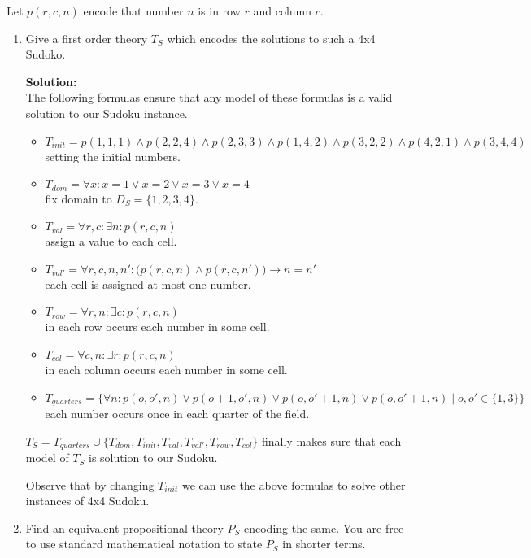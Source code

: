 \documentclass[11pt,a4paper]{uebung}
\newcommand{\solution}[1]{\par {\bf Solution:}\\#1}
\begin{document}
Let $p(r,c,n)$ encode that number $n$ is in row $r$ and column $c$.

\begin{enumerate}
\item Give a first order theory $T_S$ which encodes the solutions to such a
  4x4 Sudoko.

\solution{
  The following formulas ensure that any
  model of these formulas is a valid solution to our Sudoku instance.
  \begin{itemize}
  \item $T_{\mathit init}= p(1,1,1) \land p(2,2,4) \land p(2,3,3) \land p(1,4,2) \land p(3,2,2) \land
    p(4,2,1) \land p(3,4,4)$ \\ setting the initial numbers.
  \item $T_{\mathit dom} = \forall x : x=1 \lor x=2 \lor x=3 \lor x=4$ \\
    fix domain to $D_S=\{1,2,3,4\}$.
  \item $T_{\mathit val}= \forall r,c: \exists n: p(r,c,n)$ \\ assign a value to each cell.
  \item $T_{\mathit val'}= \forall r,c,n,n': \big( p(r,c,n) \land p(r,c,n')
    \big) \rightarrow n =n'$ \\ each cell is assigned at most one number.
  \item $T_{\mathit row} = \forall r,n: \exists c: p(r,c,n)$ \\ in each row
    occurs each number in some cell.
  \item $T_{\mathit col} = \forall c,n: \exists r: p(r,c,n)$ \\ in each column
    occurs each number in some cell.
  \item $T_{\mathit quarters} = \big\{ \forall n: p(o,o',n) \lor p(o+1,o',n) \lor
    p(o,o'+1,n) \lor p(o,o'+1,n) \mid o,o' \in \{1,3\} \big\}$ \\ each number occurs
    once in each quarter of the field.
  \end{itemize}
  $T_S = T_{\mathit quarters} \cup \{ T_{\mathit dom}, T_{\mathit init},
  T_{\mathit val}, T_{\mathit val'}, T_{\mathit row}, T_{\mathit col}\}$
  finally makes sure that each model of $T_S$ is solution to our Sudoku.

  Observe that by changing $T_{\mathit init}$ we can use the above formulas to
  solve other instances of 4x4 Sudoku.
}


\item Find an equivalent propositional theory $P_S$ encoding the same. You are
  free to use standard mathematical notation to state $P_S$ in shorter terms.


\end{enumerate}
\end{document}

